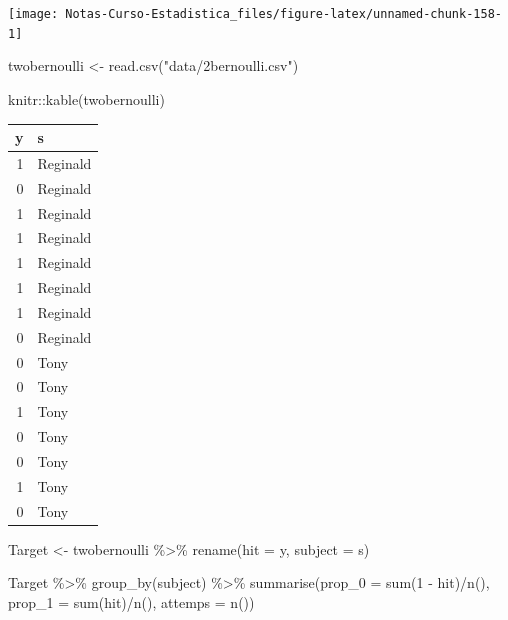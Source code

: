 \documentclass[
  12pt,
]{book}
\newenvironment{Shaded}{\begin{snugshade}}{\end{snugshade}}
\newcommand{\AttributeTok}[1]{\textcolor[rgb]{0.77,0.63,0.00}{#1}}
\newcommand{\DecValTok}[1]{\textcolor[rgb]{0.00,0.00,0.81}{#1}}
\newcommand{\FunctionTok}[1]{\textcolor[rgb]{0.00,0.00,0.00}{#1}}
\newcommand{\NormalTok}[1]{#1}
\newcommand{\OtherTok}[1]{\textcolor[rgb]{0.56,0.35,0.01}{#1}}
\newcommand{\SpecialCharTok}[1]{\textcolor[rgb]{0.00,0.00,0.00}{#1}}
\newcommand{\StringTok}[1]{\textcolor[rgb]{0.31,0.60,0.02}{#1}}
\theoremstyle{definition}
\theoremstyle{definition}
\theoremstyle{definition}
\theoremstyle{remark}
\begin{document}
\begin{center}\texttt{[image: Notas-Curso-Estadistica\_files/figure-latex/unnamed-chunk-158-1]} \end{center}

\begin{Shaded}
\begin{Highlighting}[]
\NormalTok{twobernoulli }\OtherTok{\textless{}{-}} \FunctionTok{read.csv}\NormalTok{(}\StringTok{"data/2bernoulli.csv"}\NormalTok{)}

\NormalTok{knitr}\SpecialCharTok{::}\FunctionTok{kable}\NormalTok{(twobernoulli)}
\end{Highlighting}
\end{Shaded}

\begin{tabular}{r|l}
\hline
y & s\\
\hline
1 & Reginald\\
\hline
0 & Reginald\\
\hline
1 & Reginald\\
\hline
1 & Reginald\\
\hline
1 & Reginald\\
\hline
1 & Reginald\\
\hline
1 & Reginald\\
\hline
0 & Reginald\\
\hline
0 & Tony\\
\hline
0 & Tony\\
\hline
1 & Tony\\
\hline
0 & Tony\\
\hline
0 & Tony\\
\hline
1 & Tony\\
\hline
0 & Tony\\
\hline
\end{tabular}

\begin{Shaded}
\begin{Highlighting}[]
\NormalTok{Target }\OtherTok{\textless{}{-}}\NormalTok{ twobernoulli }\SpecialCharTok{\%\textgreater{}\%} \FunctionTok{rename}\NormalTok{(}\AttributeTok{hit =}\NormalTok{ y, }\AttributeTok{subject =}\NormalTok{ s)}

\NormalTok{Target }\SpecialCharTok{\%\textgreater{}\%} \FunctionTok{group\_by}\NormalTok{(subject) }\SpecialCharTok{\%\textgreater{}\%} \FunctionTok{summarise}\NormalTok{(}\AttributeTok{prop\_0 =} \FunctionTok{sum}\NormalTok{(}\DecValTok{1} \SpecialCharTok{{-}} 
\NormalTok{    hit)}\SpecialCharTok{/}\FunctionTok{n}\NormalTok{(), }\AttributeTok{prop\_1 =} \FunctionTok{sum}\NormalTok{(hit)}\SpecialCharTok{/}\FunctionTok{n}\NormalTok{(), }\AttributeTok{attemps =} \FunctionTok{n}\NormalTok{())}
\end{Highlighting}
\end{Shaded}
\end{document}
